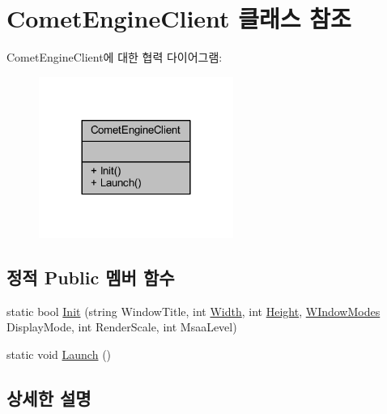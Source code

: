\hypertarget{class_comet_engine_1_1_client_1_1_comet_engine_client}{}\section{Comet\+Engine\+Client 클래스 참조}
\label{class_comet_engine_1_1_client_1_1_comet_engine_client}


Comet\+Engine\+Client에 대한 협력 다이어그램\+:\nopagebreak
\begin{figure}[H]
\begin{center}
\leavevmode
\includegraphics[width=180pt]{class_comet_engine_1_1_client_1_1_comet_engine_client__coll__graph}
\end{center}
\end{figure}
\subsection*{정적 Public 멤버 함수}
\begin{DoxyCompactItemize}
\item 
static bool \hyperlink{class_comet_engine_1_1_client_1_1_comet_engine_client_af5f8db49a5de5bb41cf935066d21f5aa}{Init} (string Window\+Title, int \hyperlink{_d_l_l_comet_engine_win32_8cpp_abbe7749c3b402f7dfe64f936774cfcd4}{Width}, int \hyperlink{_d_l_l_comet_engine_win32_8cpp_afd53bc431b967813e00ae3cfecd5c548}{Height}, \hyperlink{namespace_comet_engine_1_1_client_a608d2e459fd95babca189e50f4182a65}{W\+Indow\+Modes} Display\+Mode, int Render\+Scale, int Msaa\+Level)
\item 
static void \hyperlink{class_comet_engine_1_1_client_1_1_comet_engine_client_aee7b13887a71ba1fcd42c5fbccf124d4}{Launch} ()
\end{DoxyCompactItemize}


\subsection{상세한 설명}


